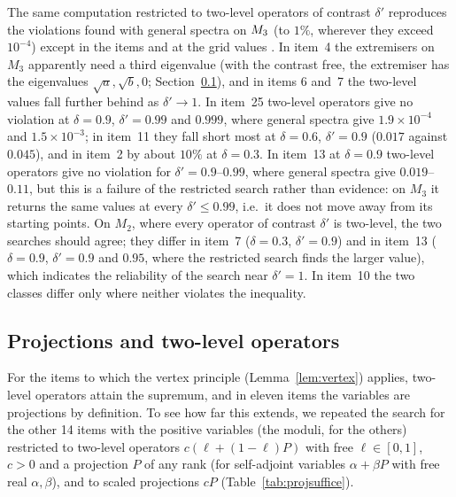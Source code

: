 \documentclass[11pt]{article}
\theoremstyle{plain}
\theoremstyle{definition}
\theoremstyle{remark}
\begin{document}
The same computation restricted to two-level operators of contrast $\delta'$ reproduces the violations found with
general spectra on $M_{3}$ (to $1\%$, wherever they exceed $10^{-4}$) except in the items and at the
grid values \TCCTwoLevelShort. In item~4 the extremisers on $M_3$ apparently need a third eigenvalue (with the contrast
free, the extremiser has the eigenvalues $\sqrt a,\sqrt b,0$; Section~\ref{sec:projsuffice}), and in items 6 and~7 the two-level values fall further behind as $\delta'\to1$. In item~25 two-level operators give no violation
at $\delta=0.9$, $\delta'=0.99$ and $0.999$, where general spectra give $1.9\times10^{-4}$ and $1.5\times10^{-3}$; in
item~11 they fall short most at $\delta=0.6$, $\delta'=0.9$ ($0.017$ against $0.045$), and in item~2 by about
$10\%$ at $\delta=0.3$. In item~13 at $\delta=0.9$ two-level operators give no violation for $\delta'=0.9$--$0.99$,
where general spectra give $0.019$--$0.11$, but this is a failure of the restricted search rather than evidence: on
$M_3$ it returns the same values at every $\delta'\le0.99$, i.e.\ it does not move away from its starting points. On
$M_2$, where every operator of contrast $\delta'$ is two-level, the two searches should agree; they differ in item~7
($\delta=0.3$, $\delta'=0.9$) and in item~13 ($\delta=0.9$, $\delta'=0.9$ and $0.95$, where the restricted search finds
the larger value), which indicates the reliability of the search near $\delta'=1$. In item~10 the two classes differ only
where neither violates the inequality.

\subsection{Projections and two-level operators}\label{sec:projsuffice}

For the items to which the vertex principle (Lemma~\ref{lem:vertex}) applies, two-level operators attain the supremum,
and in eleven items the variables are projections by definition. To see how far this extends, we repeated the search for
the other 14 items with the positive variables (the moduli, for the others) restricted to two-level operators
$c(\ell+(1-\ell)P)$ with free $\ell\in[0,1]$, $c>0$ and a projection $P$ of any rank (for self-adjoint variables
$\alpha+\beta P$ with free real $\alpha,\beta$), and to scaled projections $cP$ (Table~\ref{tab:projsuffice}).
\end{document}
